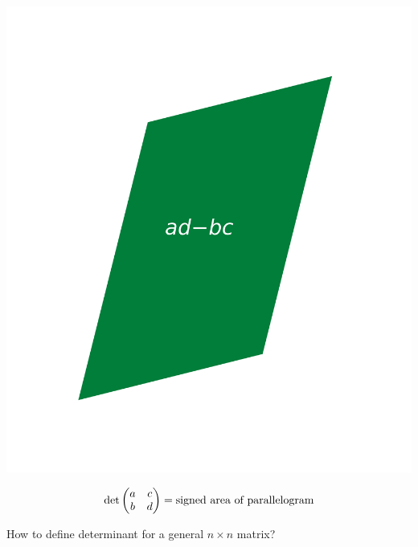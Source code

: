 \documentclass[pdf,9pt]{beamer}
\begin{document}
\begin{frame}[fragile]
\begin{center}
    \includegraphics[scale=0.07]{./figures/Area_parallellogram_as_determinant2.png}
\end{center}
\vfill

\begin{align*}
    \det \begin{pmatrix} a & c \cr b & d \end{pmatrix}  = \text{signed area of parallelogram}
\end{align*}
\end{frame}
\begin{frame}[fragile]
    \begin{problem}
	How to define determinant for a general $n\times n$ matrix?
    \end{problem}
\end{frame}
\end{document}
